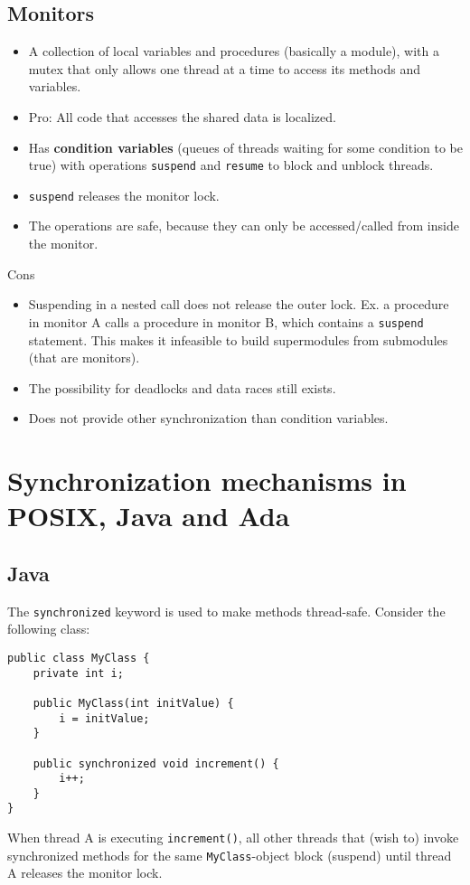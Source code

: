 \subsection{Monitors}
\begin{itemize}
    \item A collection of local variables and procedures (basically a module), with a mutex that only allows one thread at a time to access its methods and variables.
    \item Pro: All code that accesses the shared data is localized.
    \item Has \textbf{condition variables} (queues of threads waiting for some condition to be true) with operations \texttt{suspend} and \texttt{resume} to block and unblock threads.
    \item \texttt{suspend} releases the monitor lock.
    \item The operations are safe, because they can only be accessed/called from inside the monitor.
\end{itemize}
Cons
\begin{itemize}
    \item Suspending in a nested call does not release the outer lock. Ex. a procedure in monitor A calls a procedure in monitor B, which contains a \texttt{suspend} statement. This makes it infeasible to build supermodules from submodules (that are monitors). 
    \item The possibility for deadlocks and data races still exists.
    \item Does not provide other synchronization than condition variables.
\end{itemize}

\section{Synchronization mechanisms in POSIX, Java and Ada}
\subsection{Java}
The \texttt{synchronized} keyword is used to make methods thread-safe. Consider the following class:
\begin{verbatim}
public class MyClass {
    private int i;

    public MyClass(int initValue) {
        i = initValue;
    }

    public synchronized void increment() {
        i++;
    }
}
\end{verbatim}
When thread A is executing \texttt{increment()}, all other threads that (wish to) invoke synchronized methods for the same \texttt{MyClass}-object block (suspend) until thread A releases the monitor lock.

